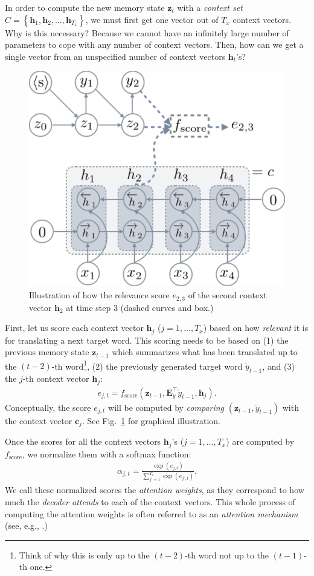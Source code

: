 \documentclass{report}
\newcommand{\vect}[1]{\mathbf{#1}}
\newcommand{\matr}[1]{\mathbf{#1}}
\newcommand{\vc}[0]{\vect{c}}
\newcommand{\vh}[0]{\vect{h}}
\newcommand{\vz}[0]{\vect{z}}
\newcommand{\mE}[0]{\matr{E}}
\begin{document}
In order to compute the new memory state $\vz_t$ with a {\em context set}
$C=\left\{ \vh_1, \vh_2, \ldots, \vh_{T_x}\right\}$,
we must first get one vector out of $T_x$ context vectors. Why is this
necessary? Because we cannot have an infinitely large number of parameters to
cope with any number of context vectors. Then, how can we get a single vector
from an unspecified number of context vectors $\vh_t$'s?

\begin{figure}[t]
    \centering
    \centering
    \includegraphics[width=0.7\columnwidth]{figures/nmt_att.pdf}

    \caption{Illustration of how the relevance score $e_{2,3}$ of the second
    context vector $\vh_2$ at time step $3$ (dashed curves and box.)}
    \label{fig:att1}
\end{figure}

First, let us score each context vector $\vh_j$ ($j=1, \ldots, T_x$) based on
how {\em relevant} it is for translating a next target word. This scoring needs
to be based on (1) the previous memory state $\vz_{t-1}$ which summarizes what
has been translated up to the $(t-2)$-th word\footnote{
    Think of why this is only up to the $(t-2)$-th word not up to the $(t-1)$-th
    one.
}, (2) the previously generated target word $\tilde{y}_{t-1}$, and (3) the
$j$-th context vector $\vh_j$: 
\begin{align}
    \label{eq:nmt_score}
    e_{j, t} = f_{\text{score}}(\vz_{t-1}, \mE_y^\top \tilde{y}_{t-1}, \vh_j).
\end{align}
Conceptually, the score $e_{j,t}$ will be computed by {\em comparing}
$(\vz_{t-1}, \tilde{y}_{t-1})$ with the context vector $\vc_j$. See
Fig.~\ref{fig:att1} for graphical illustration.

Once the scores for all the context vectors $\vh_j$'s ($j=1, \ldots, T_x$) are
computed by $f_{\text{score}}$, we normalize them with a softmax function:
\begin{align}
    \label{eq:att_weight}
    \alpha_{j, t} = \frac{\exp(e_{j,t})}{\sum_{j'=1}^{T_x} \exp(e_{j',t})}.
\end{align}
We call these normalized scores the {\em attention weights}, as they correspond
to how much the {\em decoder attends} to each of the context vectors. This whole
process of computing the attention weights is often referred to as an {\em
attention mechanism} (see, e.g., \cite{cho2015describing}.)
\end{document}
